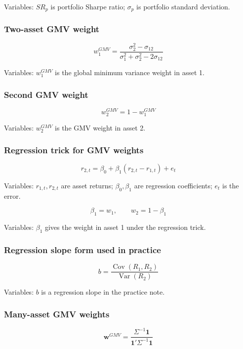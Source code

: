 \documentclass[
  8pt,
  twocolumn]{extarticle}
\begin{document}
Variables: \(SR_p\) is portfolio Sharpe ratio; \(\sigma_p\) is portfolio
standard deviation.

\subsubsection{Two-asset GMV weight}\label{two-asset-gmv-weight}

\[
w_1^{GMV}=\frac{\sigma_2^2-\sigma_{12}}{\sigma_1^2+\sigma_2^2-2\sigma_{12}}
\]

Variables: \(w_1^{GMV}\) is the global minimum variance weight in asset
1.

\subsubsection{Second GMV weight}\label{second-gmv-weight}

\[
w_2^{GMV}=1-w_1^{GMV}
\]

Variables: \(w_2^{GMV}\) is the GMV weight in asset 2.

\subsubsection{Regression trick for GMV
weights}\label{regression-trick-for-gmv-weights}

\[
r_{2,t}=\beta_0+\beta_1(r_{2,t}-r_{1,t})+e_t
\]

Variables: \(r_{1,t},r_{2,t}\) are asset returns; \(\beta_0,\beta_1\)
are regression coefficients; \(e_t\) is the error.

\[
\beta_1=w_1,\qquad w_2=1-\beta_1
\]

Variables: \(\beta_1\) gives the weight in asset 1 under the regression
trick.

\subsubsection{Regression slope form used in
practice}\label{regression-slope-form-used-in-practice}

\[
b=\frac{\operatorname{Cov}(R_1,R_2)}{\operatorname{Var}(R_2)}
\]

Variables: \(b\) is a regression slope in the practice note.

\subsubsection{Many-asset GMV weights}\label{many-asset-gmv-weights}

\[
\mathbf w^{GMV}=\frac{\Sigma^{-1}\mathbf 1}{\mathbf 1'\Sigma^{-1}\mathbf 1}
\]
\end{document}
